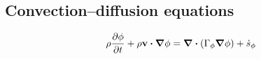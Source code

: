 
\subsection{Convection--diffusion equations}

\begin{equation} \label{eq:cde_general_convection_diffusion_equation}
	\rho \pdv{\phi}{t} + \rho \vb{v} \vdot \grad{\phi} = 
	\div(\Gamma_\phi \grad{\phi}) + \dot{s}_\phi
\end{equation}




